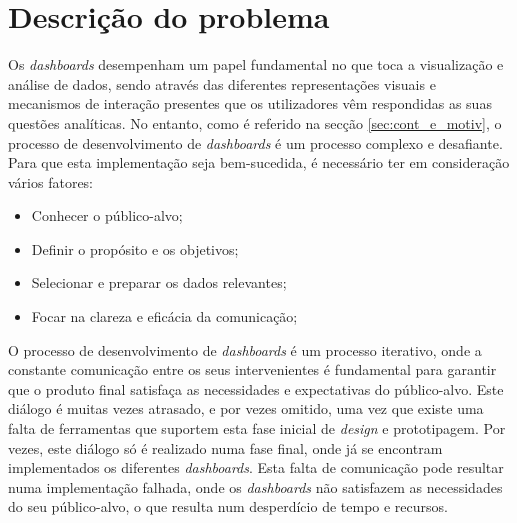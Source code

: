 \section{Descrição do problema}
\label{sec:des_problema}

Os \textit{dashboards} desempenham um papel fundamental no que toca a visualização e análise de dados, sendo através das diferentes representações visuais e mecanismos de interação presentes que os utilizadores vêm respondidas as suas questões analíticas. No entanto, como é referido na secção \ref{sec:cont_e_motiv}, o processo de desenvolvimento de \textit{dashboards} é um processo complexo e desafiante. Para que esta implementação seja bem-sucedida, é necessário ter em consideração vários fatores:

\begin{itemize}
    \item Conhecer o público-alvo;
    \item Definir o propósito e os objetivos;
    \item Selecionar e preparar os dados relevantes;
    \item Focar na clareza e eficácia da comunicação;
\end{itemize}

O processo de desenvolvimento de \textit{dashboards} é um processo iterativo, onde a constante comunicação entre os seus intervenientes é fundamental para garantir que o produto final satisfaça as necessidades e expectativas do público-alvo. Este diálogo é muitas vezes atrasado, e por vezes omitido, uma vez que existe uma falta de ferramentas que suportem esta fase inicial de \textit{design} e prototipagem. Por vezes, este diálogo só é realizado numa fase final, onde já se encontram implementados os diferentes \textit{dashboards}. Esta falta de comunicação pode resultar numa implementação falhada, onde os \textit{dashboards} não satisfazem as necessidades do seu público-alvo, o que resulta num desperdício de tempo e recursos.

